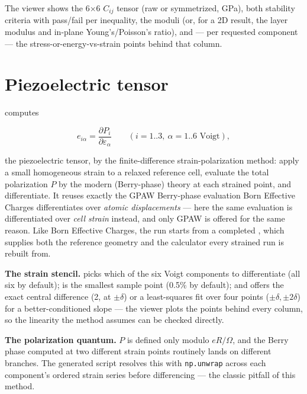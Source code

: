 The viewer shows the 6$\times$6 $C_{ij}$ tensor (raw or symmetrized, GPa),
both stability criteria with pass/fail per inequality, the moduli (or, for
a 2D result, the layer modulus and in-plane Young's/Poisson's ratio), and
--- per requested component --- the stress-or-energy-vs-strain points
behind that column.

\section{Piezoelectric tensor}
\label{sec:piezoelectric}

\menusep{} computes

\[
e_{i\alpha} = \frac{\partial P_i}{\partial \varepsilon_\alpha}
\qquad (i = 1..3,\ \alpha = 1..6 \text{ Voigt}),
\]

the piezoelectric tensor, by the finite-difference strain-polarization
method: apply a small homogeneous strain to a relaxed reference cell,
evaluate the total polarization $P$ by the modern (Berry-phase) theory at
each strained point, and differentiate. It reuses exactly the GPAW
Berry-phase evaluation Born Effective Charges differentiates over
\emph{atomic displacements} --- here the same evaluation is differentiated
over \emph{cell strain} instead, and only GPAW is offered for the same
reason. Like Born Effective Charges, the run starts from a completed
\menusep{} , which
supplies both the reference geometry and the calculator every strained run
is rebuilt from.

\textbf{The strain stencil.}  picks which of the six
Voigt components to differentiate (all six by default);  is the smallest sample point (0.5\% by default); and
 offers the exact central difference (2, at
$\pm\delta$) or a least-squares fit over four points ($\pm\delta,
\pm2\delta$) for a better-conditioned slope --- the viewer plots the points
behind every column, so the linearity the method assumes can be checked
directly.

\begin{calnote}
\textbf{The polarization quantum.} $P$ is defined only modulo $eR/\Omega$,
and the Berry phase computed at two different strain points routinely lands
on different branches. The generated script resolves this with
\texttt{np.unwrap} across each component's ordered strain series before
differencing --- the classic pitfall of this method.
\end{calnote}

